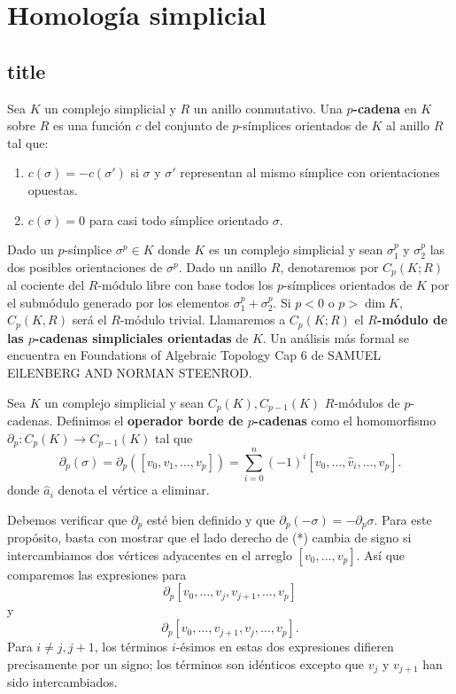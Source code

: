 
\chapter{Homología simplicial}

\section{title}
 \begin{definicion}
 	Sea $K$ un complejo simplicial y $R$ un anillo conmutativo. Una \textbf{$p$-cadena} en $K$ sobre $R$ es una función $c$ del conjunto de $p$-símplices orientados de $K$ al anillo $R$ tal que:
 	\begin{enumerate}
 		\item $c(\sigma) = -c(\sigma')$ si $\sigma$ y $\sigma'$ representan al mismo símplice con orientaciones opuestas.
 		\item $c(\sigma) = 0$ para casi todo símplice orientado $\sigma$.
 	\end{enumerate}
 \end{definicion}
 
Dado un $p$-símplice $\sigma^p \in K$ donde $K$ es un complejo simplicial y sean $\sigma^p_1$ y $\sigma^p_2$ las dos posibles orientaciones de $\sigma^p$. Dado un anillo $R$, denotaremos por $C_p(K;R)$ al cociente del $R$-módulo libre con base todos los $p$-símplices orientados de $K$ por el submódulo generado por los elementos  $\sigma^p_1+\sigma^p_2$. Si $p<0$ o $p > \dim{K}$, $C_p(K,R)$ será el $R$-módulo trivial. Llamaremos a $C_p(K;R)$ el \textbf{$R$-módulo de las $p$-cadenas simpliciales orientadas} de $K$. Un análisis más formal se encuentra en Foundations of Algebraic Topology Cap 6 de SAMUEL ElLENBERG AND NORMAN STEENROD.

\begin{definicion}
	Sea $K$ un complejo simplicial y sean $C_p(K), C_{p-1}(K)$ $R$-módulos de $p$-cadenas. Definimos el \textbf{operador borde de $p$-cadenas} como el homomorfismo \(\partial_p : C_p(K) \to C_{p-1}(K)\) tal que
	\[
		\partial_p(\sigma) = \partial_p([v_0, v_1, \ldots, v_p]) = \sum_{i=0}^{n} (-1)^i[v_0, \ldots, \hat{v}_i, \ldots, v_p] .
	\]
	donde \(\hat{a}_i\) denota el vértice a eliminar.
\end{definicion}

Debemos verificar que \(\partial_p\) esté bien definido y que \(\partial_p(-\sigma) = -\partial_p \sigma\). Para este propósito, basta con mostrar que el lado derecho de (*) cambia de signo si intercambiamos dos vértices adyacentes en el arreglo \([v_0, \ldots, v_p]\). Así que comparemos las expresiones para
\[
\partial_p[v_0, \ldots, v_j, v_{j+1}, \ldots, v_p]
\]
y
\[
\partial_p[v_0, \ldots, v_{j+1}, v_j, \ldots, v_p].
\]
Para \(i \neq j, j+1\), los términos \(i\)-ésimos en estas dos expresiones difieren precisamente por un signo; los términos son idénticos excepto que \(v_j\) y \(v_{j+1}\) han sido intercambiados.

